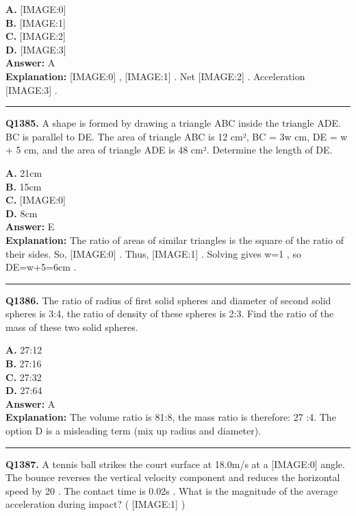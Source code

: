 \documentclass[12pt]{article}
\begin{document}
\textbf{A.} [IMAGE:0] \\
\textbf{B.} [IMAGE:1] \\
\textbf{C.} [IMAGE:2] \\
\textbf{D.} [IMAGE:3] \\

\textbf{Answer:} A \\
\textbf{Explanation:} [IMAGE:0]
,
[IMAGE:1]
. Net
[IMAGE:2]
. Acceleration
[IMAGE:3]
.

\hrule
\vspace{1em}


\noindent
\textbf{Q1385.} A shape is formed by drawing a triangle ABC inside the triangle ADE. BC is parallel to DE. The area of triangle ABC is 12 cm², BC = 3w cm, DE = w + 5 cm, and the area of triangle ADE is 48 cm².
Determine the length of DE.



\textbf{A.} 21cm \\
\textbf{B.} 15cm \\
\textbf{C.} [IMAGE:0] \\
\textbf{D.} 8cm \\

\textbf{Answer:} E \\
\textbf{Explanation:} The ratio of areas of similar triangles is the square of the ratio of their sides. So,
[IMAGE:0]
. Thus,
[IMAGE:1]
. Solving gives w=1
, so DE=w+5=6cm
.

\hrule
\vspace{1em}


\noindent
\textbf{Q1386.} The ratio of radius of first solid spheres and diameter of second solid spheres is 3:4, the ratio of density of these spheres is 2:3. Find the ratio of the mass of these two solid spheres.



\textbf{A.} 27:12 \\
\textbf{B.} 27:16 \\
\textbf{C.} 27:32 \\
\textbf{D.} 27:64 \\

\textbf{Answer:} A \\
\textbf{Explanation:} The volume ratio is 81:8, the mass ratio is therefore: 27 :4. The option D is a misleading term (mix up radius and diameter).

\hrule
\vspace{1em}


\noindent
\textbf{Q1387.} A tennis ball strikes the court surface at 18.0m/s
at a
[IMAGE:0]
angle. The bounce reverses the vertical velocity component and reduces the horizontal speed by 20%
. The contact time is 0.02s
.
What is the magnitude of the average acceleration during impact?
(
[IMAGE:1]
)
\end{document}
